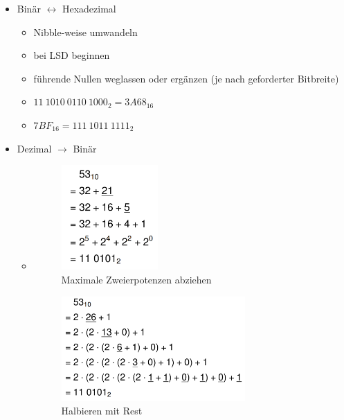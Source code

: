 \documentclass[11pt,a4paper]{article}
\begin{document}
\begin{itemize}
\begin{itemize}
	\item Binär $\leftrightarrow$ Hexadezimal
		\begin{itemize}
		\item Nibble-weise umwandeln
		\item bei LSD beginnen 
		\item führende Nullen weglassen oder ergänzen (je nach geforderter Bitbreite)
		\item $11~1010~0110~1000_2 = 3A68_{16}$
		\item $7BF_{16} = 111~1011~1111_2$
		\end{itemize}
		
	\item Dezimal $\rightarrow$ Binär
		\begin{itemize}
		
		\item[]
			\begin{minipage}{0.3\textwidth}
				\begin{figure}[H]
				\includegraphics[height=4cm]{dtob1}
				\caption{Maximale Zweierpotenzen abziehen}
				\end{figure}
			\end{minipage}
			\begin{minipage}[t]{0.35\textwidth}
				\begin{figure}[H]
				\vspace{-3cm}
				\includegraphics[height=4cm]{dtob2}
				\caption{Halbieren mit Rest}
				\end{figure}
			\end{minipage}
		
		\end{itemize}
	

\end{itemize}
\end{itemize}
\end{document}
